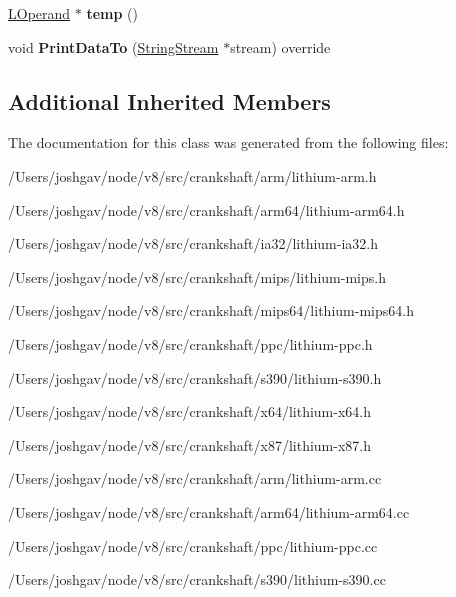 \begin{DoxyCompactItemize}
\item 
\hyperlink{classv8_1_1internal_1_1_l_operand}{L\+Operand} $\ast$ {\bfseries temp} ()\hypertarget{classv8_1_1internal_1_1_l_is_string_and_branch_aad801de23c18615fb4b86d96ed737213}{}\label{classv8_1_1internal_1_1_l_is_string_and_branch_aad801de23c18615fb4b86d96ed737213}

\item 
void {\bfseries Print\+Data\+To} (\hyperlink{classv8_1_1internal_1_1_string_stream}{String\+Stream} $\ast$stream) override\hypertarget{classv8_1_1internal_1_1_l_is_string_and_branch_a73e3b6617ffccaeffedca5703966d402}{}\label{classv8_1_1internal_1_1_l_is_string_and_branch_a73e3b6617ffccaeffedca5703966d402}

\end{DoxyCompactItemize}
\subsection*{Additional Inherited Members}


The documentation for this class was generated from the following files\+:\begin{DoxyCompactItemize}
\item 
/\+Users/joshgav/node/v8/src/crankshaft/arm/lithium-\/arm.\+h\item 
/\+Users/joshgav/node/v8/src/crankshaft/arm64/lithium-\/arm64.\+h\item 
/\+Users/joshgav/node/v8/src/crankshaft/ia32/lithium-\/ia32.\+h\item 
/\+Users/joshgav/node/v8/src/crankshaft/mips/lithium-\/mips.\+h\item 
/\+Users/joshgav/node/v8/src/crankshaft/mips64/lithium-\/mips64.\+h\item 
/\+Users/joshgav/node/v8/src/crankshaft/ppc/lithium-\/ppc.\+h\item 
/\+Users/joshgav/node/v8/src/crankshaft/s390/lithium-\/s390.\+h\item 
/\+Users/joshgav/node/v8/src/crankshaft/x64/lithium-\/x64.\+h\item 
/\+Users/joshgav/node/v8/src/crankshaft/x87/lithium-\/x87.\+h\item 
/\+Users/joshgav/node/v8/src/crankshaft/arm/lithium-\/arm.\+cc\item 
/\+Users/joshgav/node/v8/src/crankshaft/arm64/lithium-\/arm64.\+cc\item 
/\+Users/joshgav/node/v8/src/crankshaft/ppc/lithium-\/ppc.\+cc\item 
/\+Users/joshgav/node/v8/src/crankshaft/s390/lithium-\/s390.\+cc\end{DoxyCompactItemize}
